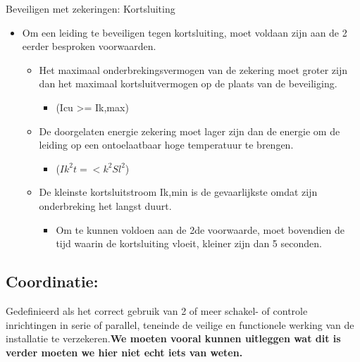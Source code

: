 \documentclass[12pt]{article}
\begin{document}
Beveiligen met zekeringen: Kortsluiting\begin{itemize}
    \item Om een leiding te beveiligen tegen kortsluiting, moet voldaan zijn aan de 2 eerder besproken voorwaarden.\begin{itemize}
        \item Het maximaal onderbrekingsvermogen van de zekering moet groter zijn dan het maximaal kortsluitvermogen op de plaats van de beveiliging.\begin{itemize}
            \item (Icu >= Ik,max)
        \end{itemize}
        \item De doorgelaten energie zekering moet lager zijn dan de energie om de leiding op een ontoelaatbaar hoge temperatuur te brengen.\begin{itemize}
            \item ($Ik^2t =< k^2Sl^2$)
        \end{itemize}
        \item De kleinste kortsluitstroom Ik,min is de gevaarlijkste omdat zijn onderbreking het langst duurt.\begin{itemize}
            \item Om te kunnen voldoen aan de 2de voorwaarde, moet bovendien de tijd waarin de kortsluiting vloeit, kleiner zijn dan 5 seconden.
        \end{itemize}
    \end{itemize} 
\end{itemize}
\subsection{Coordinatie:}
Gedefinieerd als het correct gebruik van 2 of meer schakel- of controle inrichtingen in serie of parallel, teneinde de veilige en functionele werking van de installatie te
verzekeren.\textbf{We moeten vooral kunnen uitleggen wat dit is verder moeten we hier niet echt iets van weten.}
\end{document}
